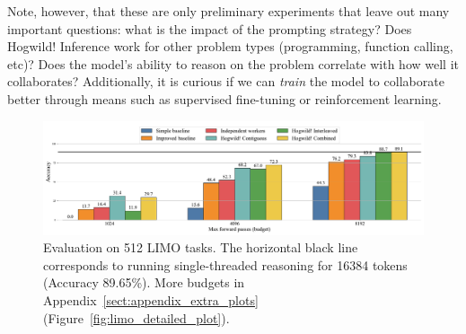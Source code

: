Note, however, that these are only preliminary experiments that leave out many important questions: what is the impact of the prompting strategy? Does Hogwild!\! Inference work for other problem types (programming, function calling, etc)? Does the model's ability to reason on the problem correlate with how well it collaborates? Additionally, it is curious if we can \textit{train} the model to collaborate better through means such as supervised fine-tuning or reinforcement learning.

\begin{figure}[t]
    \centering
    \includegraphics[width=1\linewidth]{resources/graphics.pdf}
    \caption{Evaluation on 512 LIMO tasks. The horizontal black line corresponds to running single-threaded reasoning for 16384 tokens (Accuracy 89.65\%). More budgets in Appendix~\ref{sect:appendix_extra_plots} (Figure~\ref{fig:limo_detailed_plot}).}
    \label{fig:results}
\end{figure}


